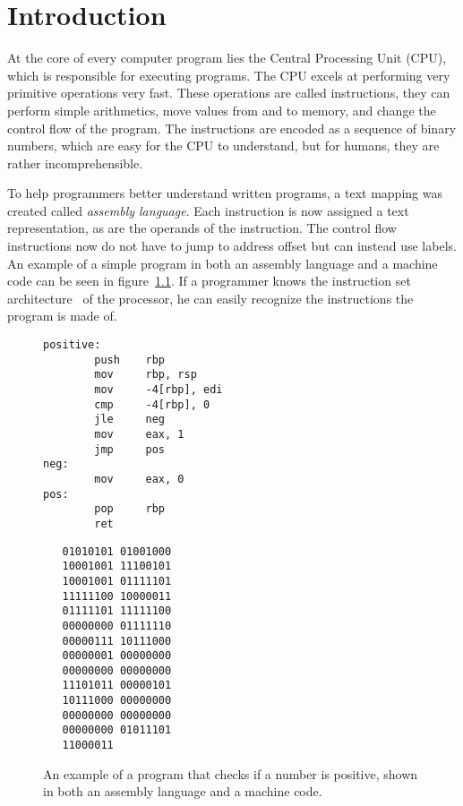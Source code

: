 \chapter{Introduction}
At the core of every computer program lies the Central Processing Unit (CPU),
which is responsible for executing programs. The CPU excels at performing very
primitive operations very fast. These operations are called instructions, they
can perform simple arithmetics, move values from and to memory, and change the
control flow of the program. The instructions are encoded as a sequence of
binary numbers, which are easy for the CPU to understand, but for humans, they
are rather incomprehensible.

To help programmers better understand written programs, a text mapping was
created called \textit{assembly language}. Each instruction is now assigned a
text representation, as are the operands of the instruction. The control flow
instructions now do not have to jump to address offset but can instead use
labels. An example of a simple program in both an assembly language and a
machine code can be seen in figure~\ref{fig:simple-assembly}. If a programmer
knows the instruction set architecture~\cite{isa} of the processor, he can
easily recognize the instructions the program is made of.

\begin{figure}
    \begin{minipage}{.45\textwidth}
    \begin{lstlisting}
positive:
        push    rbp
        mov     rbp, rsp
        mov     -4[rbp], edi
        cmp     -4[rbp], 0
        jle     neg
        mov     eax, 1
        jmp     pos
neg:
        mov     eax, 0
pos:
        pop     rbp
        ret
    \end{lstlisting}
    \end{minipage}
    \hfill\vline\hfill
    \begin{minipage}{.45\textwidth}
    \begin{lstlisting}
   01010101 01001000
   10001001 11100101
   10001001 01111101
   11111100 10000011
   01111101 11111100
   00000000 01111110
   00000111 10111000
   00000001 00000000
   00000000 00000000
   11101011 00000101
   10111000 00000000
   00000000 00000000
   00000000 01011101
   11000011
    \end{lstlisting}
    \end{minipage}
    \caption{An example of a program that checks if a number is positive, shown
    in both an assembly language and a machine code.}
    \label{fig:simple-assembly}
\end{figure}


